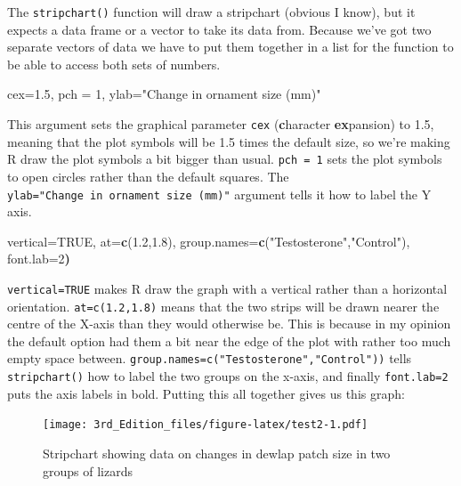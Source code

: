 \documentclass[
]{book}
\newenvironment{Shaded}{\begin{snugshade}}{\end{snugshade}}
\newcommand{\DecValTok}[1]{\textcolor[rgb]{0.00,0.00,0.81}{#1}}
\newcommand{\ErrorTok}[1]{\textcolor[rgb]{0.64,0.00,0.00}{\textbf{#1}}}
\newcommand{\FloatTok}[1]{\textcolor[rgb]{0.00,0.00,0.81}{#1}}
\newcommand{\KeywordTok}[1]{\textcolor[rgb]{0.13,0.29,0.53}{\textbf{#1}}}
\newcommand{\NormalTok}[1]{#1}
\newcommand{\OtherTok}[1]{\textcolor[rgb]{0.56,0.35,0.01}{#1}}
\newcommand{\StringTok}[1]{\textcolor[rgb]{0.31,0.60,0.02}{#1}}
\begin{document}
The \texttt{stripchart()} function will draw a stripchart (obvious I know), but it expects a data frame or a vector to take its data from. Because we've got two separate vectors of data we have to put them together in a list for the function to be able to access both sets of numbers.

\begin{Shaded}
\begin{Highlighting}[]
\NormalTok{cex=}\FloatTok{1.5}\NormalTok{,}
\NormalTok{pch =}\StringTok{ }\DecValTok{1}\NormalTok{,}
\NormalTok{ylab=}\StringTok{"Change in ornament size (mm)"}
\end{Highlighting}
\end{Shaded}

This argument sets the graphical parameter \texttt{cex} (\textbf{c}haracter \textbf{ex}pansion) to 1.5, meaning that the plot symbols will be 1.5 times the default size, so we're making R draw the plot symbols a bit bigger than usual. \texttt{pch\ =\ 1} sets the plot symbols to open circles rather than the default squares. The \texttt{ylab="Change\ in\ ornament\ size\ (mm)"} argument tells it how to label the Y axis.

\begin{Shaded}
\begin{Highlighting}[]
\NormalTok{vertical=}\OtherTok{TRUE}\NormalTok{,}
\NormalTok{at=}\KeywordTok{c}\NormalTok{(}\FloatTok{1.2}\NormalTok{,}\FloatTok{1.8}\NormalTok{),}
\NormalTok{group.names=}\KeywordTok{c}\NormalTok{(}\StringTok{"Testosterone"}\NormalTok{,}\StringTok{"Control"}\NormalTok{),}
\NormalTok{font.lab=}\DecValTok{2}\ErrorTok{)}
\end{Highlighting}
\end{Shaded}

\texttt{vertical=TRUE} makes R draw the graph with a vertical rather than a horizontal orientation. \texttt{at=c(1.2,1.8)} means that the two strips will be drawn nearer the centre of the X-axis than they would otherwise be. This is because in my opinion the default option had them a bit near the edge of the plot with rather too much empty space between. \texttt{group.names=c("Testosterone","Control"))} tells \texttt{stripchart()} how to label the two groups on the x-axis, and finally \texttt{font.lab=2} puts the axis labels in bold. Putting this all together gives us this graph:

\begin{figure}
\centering
\texttt{[image: 3rd\_Edition\_files/figure-latex/test2-1.pdf]}
\caption{\label{fig:test2}Stripchart showing data on changes in dewlap patch size in two groups of lizards}
\end{figure}
\end{document}
